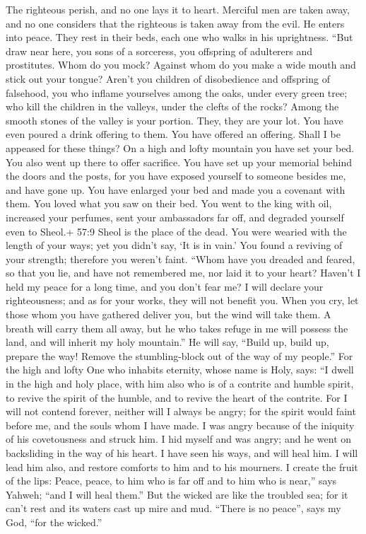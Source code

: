  The righteous perish, and no one lays it to heart. Merciful
men are taken away, and no one considers that the righteous is taken
away from the evil.  He enters into peace. They rest in
their beds, each one who walks in his uprightness.  ``But
draw near here, you sons of a sorceress, you offspring of adulterers and
prostitutes.  Whom do you mock? Against whom do you make a
wide mouth and stick out your tongue? Aren't you children of
disobedience and offspring of falsehood,  you who inflame
yourselves among the oaks, under every green tree; who kill the children
in the valleys, under the clefts of the rocks?  Among the
smooth stones of the valley is your portion. They, they are your lot.
You have even poured a drink offering to them. You have offered an
offering. Shall I be appeased for these things?  On a high
and lofty mountain you have set your bed. You also went up there to
offer sacrifice.  You have set up your memorial behind the
doors and the posts, for you have exposed yourself to someone besides
me, and have gone up. You have enlarged your bed and made you a covenant
with them. You loved what you saw on their bed.  You went to
the king with oil, increased your perfumes, sent your ambassadors far
off, and degraded yourself even to Sheol.+ 57:9 Sheol is the place of
the dead.  You were wearied with the length of your ways;
yet you didn't say, `It is in vain.' You found a reviving of your
strength; therefore you weren't faint.  ``Whom have you
dreaded and feared, so that you lie, and have not remembered me, nor
laid it to your heart? Haven't I held my peace for a long time, and you
don't fear me?  I will declare your righteousness; and as
for your works, they will not benefit you.  When you cry,
let those whom you have gathered deliver you, but the wind will take
them. A breath will carry them all away, but he who takes refuge in me
will possess the land, and will inherit my holy mountain.''
 He will say, ``Build up, build up, prepare the way! Remove
the stumbling-block out of the way of my people.''  For the
high and lofty One who inhabits eternity, whose name is Holy, says: ``I
dwell in the high and holy place, with him also who is of a contrite and
humble spirit, to revive the spirit of the humble, and to revive the
heart of the contrite.  For I will not contend forever,
neither will I always be angry; for the spirit would faint before me,
and the souls whom I have made.  I was angry because of the
iniquity of his covetousness and struck him. I hid myself and was angry;
and he went on backsliding in the way of his heart.  I have
seen his ways, and will heal him. I will lead him also, and restore
comforts to him and to his mourners.  I create the fruit of
the lips: Peace, peace, to him who is far off and to him who is near,''
says Yahweh; ``and I will heal them.''  But the wicked are
like the troubled sea; for it can't rest and its waters cast up mire and
mud.  ``There is no peace'', says my God, ``for the
wicked.''

